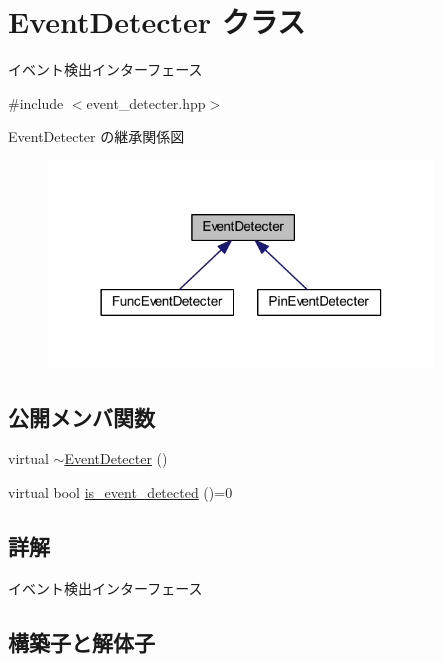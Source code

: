\hypertarget{class_event_detecter}{}\section{Event\+Detecter クラス}
\label{class_event_detecter}


イベント検出インターフェース  




{\ttfamily \#include $<$event\+\_\+detecter.\+hpp$>$}



Event\+Detecter の継承関係図
\nopagebreak
\begin{figure}[H]
\begin{center}
\leavevmode
\includegraphics[width=290pt]{class_event_detecter__inherit__graph}
\end{center}
\end{figure}
\subsection*{公開メンバ関数}
\begin{DoxyCompactItemize}
\item 
virtual \mbox{\hyperlink{class_event_detecter_a773bd1560f0c7ceb26f2919c485a6737}{$\sim$\+Event\+Detecter}} ()
\item 
virtual bool \mbox{\hyperlink{class_event_detecter_ae5f2c62e1226dcd9434eef3db92a8a70}{is\+\_\+event\+\_\+detected}} ()=0
\end{DoxyCompactItemize}


\subsection{詳解}
イベント検出インターフェース 

\subsection{構築子と解体子}
\mbox{\label{class_event_detecter_a773bd1560f0c7ceb26f2919c485a6737}} 
